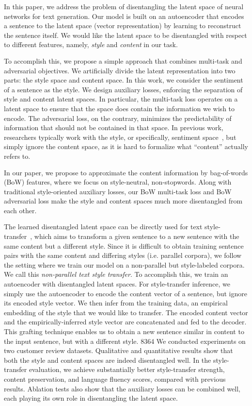 \documentclass[letterpaper]{article} %
\begin{document}
In this paper, we address the problem of disentangling the latent space of neural networks for text generation.
Our model is built on an autoencoder that encodes a sentence to the latent space (vector representation) by learning to reconstruct the sentence itself.
We would like the latent space to be disentangled with respect to different features, namely, \textit{style} and \textit{content} in our task.

To accomplish this, we propose a simple approach that combines multi-task and adversarial objectives.
We artificially divide the latent representation into two parts: the style space and content space. In this work, we consider the sentiment of a sentence as the style.
We design auxiliary losses, enforcing the separation of style and content latent spaces.
In particular, the multi-task loss operates on a latent space to ensure that the space does contain the information we wish to encode.
The adversarial loss, on the contrary, minimizes the predictability of information that should not be contained in that space.
In previous work, researchers typically work with the style, or specifically, sentiment space~\cite{hu2017toward,shen2017style,fu2018style}, but simply ignore the content space, as it is hard to formalize what ``content'' actually refers to.

In our paper, we propose to approximate the content information by bag-of-words (BoW) features, where we focus on style-neutral, non-stopwords.
Along with traditional style-oriented auxiliary losses, our BoW multi-task loss and BoW adversarial loss make the style and content spaces much more disentangled from each other.

The learned disentangled latent space can be directly used for text style-transfer~\cite{hu2017toward,shen2017style}, which aims to transform a given sentence to a new sentence with the same content but a different style.
Since it is difficult to obtain training sentence pairs with the same content and differing styles (i.e. parallel corpora), we follow the setting where we train our model on a non-parallel but style-labeled corpora. We call this \textit{non-parallel text style transfer}.
To accomplish this, we train an autoencoder with disentangled latent spaces.
For style-transfer inference, we simply use the autoencoder to encode the content vector of a sentence, but ignore its encoded style vector.
We then infer from the training data, an empirical embedding of the style that we would like to transfer.
The encoded content vector and the empirically-inferred style vector are concatenated and fed to the decoder.
This grafting technique enables us to obtain a new sentence similar in content to the input sentence, but with a different style.
8364
We conducted experiments on two customer review datasets.
Qualitative and quantitative results show that both the style and content spaces are indeed disentangled well.
In the style-transfer evaluation, we achieve substantially better style-transfer strength, content preservation, and language fluency scores, compared with previous results.
Ablation tests also show that the auxiliary losses can be combined well, each playing its own role in disentangling the latent space.
\end{document}
